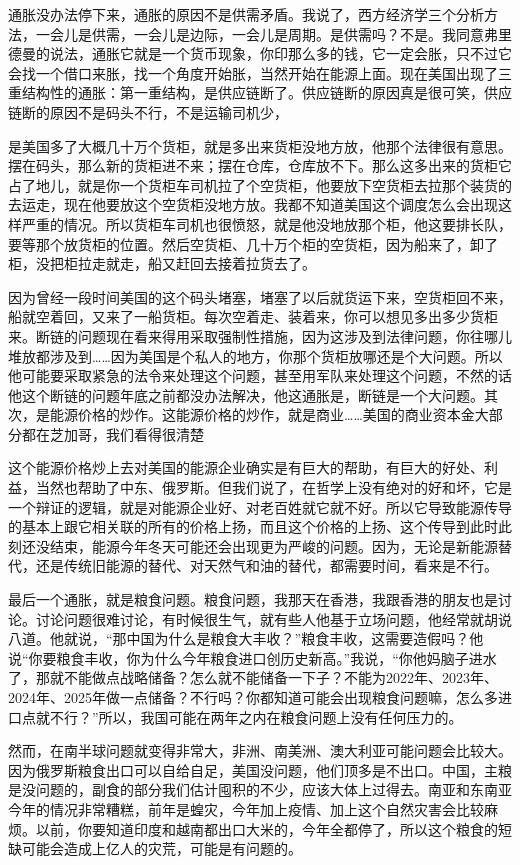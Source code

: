 \documentclass[UTF8, 12pt, a4paper]{ctexrep}
\begin{document}
通胀没办法停下来，通胀的原因不是供需矛盾。我说了，西方经济学三个分析方法，一会儿是供需，一会儿是边际，一会儿是周期。是供需吗？不是。我同意弗里德曼的说法，通胀它就是一个货币现象，你印那么多的钱，它一定会胀，只不过它会找一个借口来胀，找一个角度开始胀，当然开始在能源上面。现在美国出现了三重结构性的通胀：第一重结构，是供应链断了。供应链断的原因真是很可笑，供应链断的原因不是码头不行，不是运输司机少，

是美国多了大概几十万个货柜，就是多出来货柜没地方放，他那个法律很有意思。摆在码头，那么新的货柜进不来；摆在仓库，仓库放不下。那么这多出来的货柜它占了地儿，就是你一个货柜车司机拉了个空货柜，他要放下空货柜去拉那个装货的去运走，现在他要放这个空货柜没地方放。我都不知道美国这个调度怎么会出现这样严重的情况。所以货柜车司机也很愤怒，就是他没地放那个柜，他这要排长队，要等那个放货柜的位置。然后空货柜、几十万个柜的空货柜，因为船来了，卸了柜，没把柜拉走就走，船又赶回去接着拉货去了。

因为曾经一段时间美国的这个码头堵塞，堵塞了以后就货运下来，空货柜回不来，船就空着回，又来了一船货柜。每次空着走、装着来，你可以想见多出多少货柜来。断链的问题现在看来得用采取强制性措施，因为这涉及到法律问题，你往哪儿堆放都涉及到……因为美国是个私人的地方，你那个货柜放哪还是个大问题。所以他可能要采取紧急的法令来处理这个问题，甚至用军队来处理这个问题，不然的话他这个断链的问题年底之前都没办法解决，他这通胀是，断链是一个大问题。其次，是能源价格的炒作。这能源价格的炒作，就是商业……美国的商业资本金大部分都在芝加哥，我们看得很清楚

这个能源价格炒上去对美国的能源企业确实是有巨大的帮助，有巨大的好处、利益，当然也帮助了中东、俄罗斯。但我们说了，在哲学上没有绝对的好和坏，它是一个辩证的逻辑，就是对能源企业好、对老百姓就它就不好。所以它导致能源传导的基本上跟它相关联的所有的价格上扬，而且这个价格的上扬、这个传导到此时此刻还没结束，能源今年冬天可能还会出现更为严峻的问题。因为，无论是新能源替代，还是传统旧能源的替代、对天然气和油的替代，都需要时间，看来是不行。

最后一个通胀，就是粮食问题。粮食问题，我那天在香港，我跟香港的朋友也是讨论。讨论问题很难讨论，有时候很生气，就有些人他基于立场问题，他经常就胡说八道。他就说，“那中国为什么是粮食大丰收？”粮食丰收，这需要造假吗？他说“你要粮食丰收，你为什么今年粮食进口创历史新高。”我说，“你他妈脑子进水了，那就不能做点战略储备？怎么就不能储备一下子？不能为2022年、2023年、2024年、2025年做一点储备？不行吗？你都知道可能会出现粮食问题嘛，怎么多进口点就不行？”所以，我国可能在两年之内在粮食问题上没有任何压力的。

然而，在南半球问题就变得非常大，非洲、南美洲、澳大利亚可能问题会比较大。因为俄罗斯粮食出口可以自给自足，美国没问题，他们顶多是不出口。中国，主粮是没问题的，副食的部分我们估计囤积的不少，应该大体上过得去。南亚和东南亚今年的情况非常糟糕，前年是蝗灾，今年加上疫情、加上这个自然灾害会比较麻烦。以前，你要知道印度和越南都出口大米的，今年全都停了，所以这个粮食的短缺可能会造成上亿人的灾荒，可能是有问题的。
\end{document}
